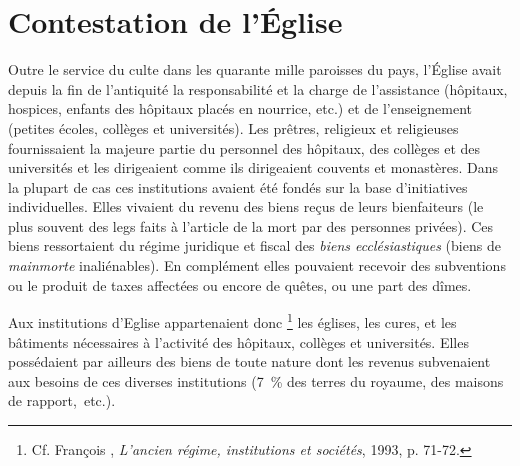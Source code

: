  
\section{Contestation de l'Église}

 Outre le service du culte dans les quarante mille paroisses du pays, l'Église avait  depuis la fin de l'antiquité la responsabilité et la charge de l'assistance (hôpitaux, hospices, enfants des hôpitaux placés en nourrice, etc.) et de l'enseignement (petites écoles, collèges et universités). Les prêtres, religieux et religieuses fournissaient la majeure partie du personnel des hôpitaux, des collèges et des universités et les dirigeaient comme ils dirigeaient couvents et monastères. Dans la plupart de cas ces institutions avaient été fondés sur la base d'initiatives individuelles. Elles vivaient du revenu des biens reçus de leurs bienfaiteurs (le plus souvent des legs faits à l'article de la mort par des personnes privées). Ces biens ressortaient du régime juridique et fiscal des \emph{biens ecclésiastiques} (biens de \emph{mainmorte} inaliénables). En complément elles pouvaient recevoir des subventions ou le produit de taxes affectées ou encore de quêtes, ou une part des dîmes. 
 
 Aux institutions d'Eglise appartenaient donc 
\footnote{Cf. François , \emph{L'ancien régime, institutions et sociétés}, 1993, p. 71-72.} 
les églises, les cures, et les bâtiments nécessaires à l'activité des hôpitaux, collèges et universités. Elles possédaient par ailleurs des biens de toute nature dont les revenus subvenaient aux besoins de ces diverses institutions (7~\% des terres du royaume, des maisons de rapport,~etc.). 

